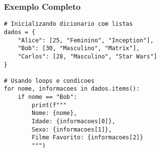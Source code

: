 \documentclass{beamer}
\begin{document}
\begin{frame}[fragile]
  \frametitle{Exemplo Completo}
  \tiny
\begin{lstlisting}
# Inicializando dicionario com listas
dados = {
    "Alice": [25, "Feminino", "Inception"],
    "Bob": [30, "Masculino", "Matrix"],
    "Carlos": [28, "Masculino", "Star Wars"]
}

# Usando loops e condicoes
for nome, informacoes in dados.items():
    if nome == "Bob":
        print(f"""
        Nome: {nome},
        Idade: {informacoes[0]},
        Sexo: {informacoes[1]},
        Filme Favorito: {informacoes[2]}
        """)
\end{lstlisting}
\end{frame}
\end{document}
